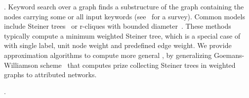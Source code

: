 .
Keyword search over a graph finds a substructure of the graph containing the nodes carrying some or all input keywords
(see~\cite{wang2010survey} for a survey).
Common models include Steiner trees~\cite{kargar2011keyword}
or r-cliques with bounded diameter~\cite{ding2007finding}.
These methods typically
compute a minimum weighted Steiner tree, which is
a special case of \abd with single label, unit node weight and predefined edge weight.
We provide approximation algorithms
to compute more general \abds,
by generalizing Goemans-Williamson scheme~\cite{goemans1995general}
that computes prize collecting Steiner trees
in weighted graphs to attributed networks.

.